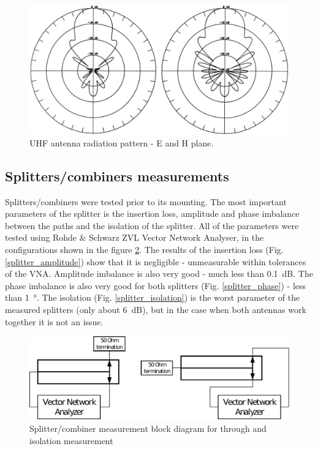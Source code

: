 \begin{figure}
    \centering
    \includegraphics[width=0.75\paperwidth]{img/7/radiation_435.png}
    \caption{UHF antenna radiation pattern - E and H plane.}
    \label{radiation_435}
\end{figure}



\subsection{Splitters/combiners measurements}
Splitters/combiners were tested prior to its mounting. The most important parameters of the splitter is the insertion loss, amplitude and phase imbalance between the paths and the isolation of the splitter. All of the parameters were tested using Rohde \& Schwarz ZVL Vector Network Analyser, in the configurations shown in the figure \ref{splitter_measurement_diagram}. The results of the insertion loss (Fig. \ref{splitter_amplitude}) show that it is negligible - unmeasurable within tolerances of the VNA. Amplitude imbalance is also very good - much less than \SI{0.1}{\dB}. The phase imbalance is also very good for both splitters (Fig. \ref{splitter_phase}) - less than \SI{1}{\degree}. The isolation (Fig. \ref{splitter_isolation}) is the worst parameter of the measured splitters (only about \SI{6}{\dB}), but in the case when both antennas work together it is not an issue.

\begin{figure}
    \centering
    \includegraphics[width=0.75\paperwidth]{img/7/splitter_measurement_diagram.pdf}
    \caption{Splitter/combiner measurement block diagram for through and isolation measurement}
    \label{splitter_measurement_diagram}
\end{figure}

